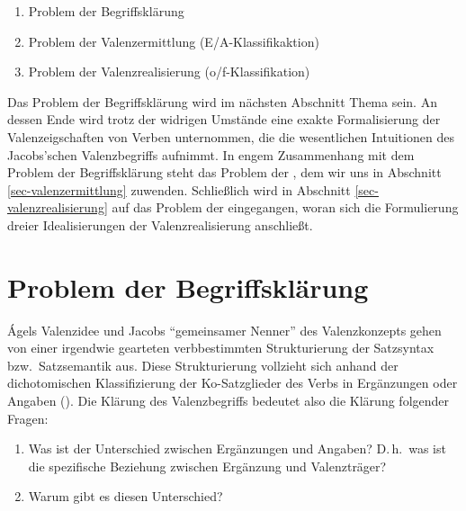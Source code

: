\begin{enumerate}\setlength{\itemsep}{-.5ex}
  \item Problem der Begriffsklärung
  \item Problem der Valenzermittlung (E/A-Klassifikaktion)
  \item Problem der Valenzrealisierung (o/f-Klassifikation)
\end{enumerate}   
Das Problem der Begriffsklärung wird im nächsten Abschnitt Thema sein. An dessen Ende wird trotz der widrigen Umstände eine exakte Formalisierung der Valenzeigschaften von Verben unternommen, die die wesentlichen Intuitionen des Jacobs'schen Valenzbegriffs aufnimmt. In engem Zusammenhang mit dem Problem der Begriffsklärung steht das Problem der , dem wir uns in Abschnitt \ref{sec-valenzermittlung} zuwenden. Schlie\ss lich wird in Abschnitt \ref{sec-valenzrealisierung} auf das Problem der  eingegangen, woran sich die Formulierung dreier Idealisierungen der Valenzrealisierung anschließt. 





\section{Problem der Begriffsklärung} \label{sec-valenzbegriff}


\'Agels Valenzidee und Jacobs "`gemeinsamer Nenner"' des Valenzkonzepts gehen von einer irgendwie gearteten verbbestimmten Strukturierung der Satzsyntax bzw.\ Satzsemantik aus. Diese Strukturierung vollzieht sich anhand der dichotomischen Klassifizierung der Ko-Satzglieder des Verbs in Ergänzungen oder Angaben (). Die Klärung des Valenzbegriffs bedeutet also die Klärung folgender Fragen:

\begin{enumerate}
	\item Was ist der Unterschied zwischen Ergänzungen und Angaben? D.\,h.\ was ist die spezifische Beziehung zwischen Ergänzung und Valenzträger?
	\item Warum gibt es diesen Unterschied?   
\end{enumerate}

